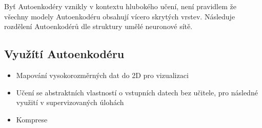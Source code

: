 Byť Autoenkodéry vznikly v kontextu hlubokého učení, není pravidlem že všechny modely Autoenkodéru obsahují vícero skrytých vrstev. Následuje rozdělení Autoenkodérů dle struktury umělé neuronové sítě.

\subsection{Využítí Autoenkodéru}

\begin{itemize}
    \item Mapování vysokorozměrných dat do 2D pro vizualizaci
    \item Učení se abstraktních vlastností o vstupních datech bez učitele, pro následné využití v supervizovaných úlohách
    \item Komprese
\end{itemize}